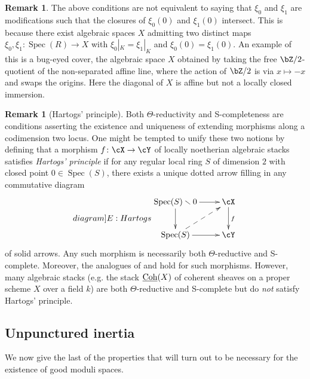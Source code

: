 \documentclass[a4paper]{amsart}
\numberwithin{equation}{section}
\theoremstyle{plain}
\theoremstyle{definition}
\newtheorem{remark}[thm]{Remark}
\DeclareMathOperator{\Spec}{Spec}
\newcommand{\uCoh}{\underline{{\rm Coh}}}
\newcommand{\co}{\colon}
\begin{document}
\begin{remark}
The above conditions are not equivalent to saying that $\xi_0$ and $\xi_1$ are modifications such that the closures of $\xi_0(0)$ and $\xi_1(0)$ intersect. This is because there exist algebraic spaces $X$ admitting  two distinct maps $\xi_0, \xi_1 \co \Spec(R) \to X$ with $\xi_0|_K = \xi_1|_K$ and $\xi_0(0) = \xi_1(0)$. An example of this is a bug-eyed cover,  the algebraic space $X$ obtained by taking the free $\bZ/2$-quotient of the non-separated affine line, where the action of $\bZ/2$ is via $x \mapsto -x$ and swaps the origins. Here the diagonal of $X$ is affine but not a locally closed immersion.
\end{remark}

\begin{remark}[Hartogs' principle]
Both $\Theta$-reductivity and {\textsf{S}}-completeness are conditions asserting the existence and uniqueness of extending morphisms along a codimension two locus.  One might be tempted to unify these two notions by defining that a morphism $f \co \cX \to \cY$ of locally noetherian algebraic stacks satisfies \emph{Hartogs' principle} if for any regular local ring $S$ of dimension $2$ with closed point $0 \in \Spec(S)$, there exists a unique dotted arrow filling in any commutative diagram
\begin{equation} \label[diagram]{E:Hartogs}
\begin{split}
\xymatrix{
\Spec(S) \smallsetminus 0 \ar[r] \ar[d]					& \cX \ar[d]^f \\
\Spec(S) \ar[r] \ar@{-->}[ur]		& \cY
}
\end{split} \end{equation}
of solid arrows.  Any such morphism is necessarily both $\Theta$-reductive and {\textsf{S}}-complete.  Moreover, the analogues of  and  hold for such morphisms.  However, many algebraic stacks (e.g. the stack $\uCoh(X)$ of coherent sheaves on a proper scheme $X$ over a field $k$) are both $\Theta$-reductive and {\textsf{S}}-complete but do \emph{not} satisfy Hartogs' principle.
\end{remark}




\subsection{Unpunctured inertia}

We now give the last of the properties that will turn out to be necessary for the existence of good moduli spaces.  
\end{document}
